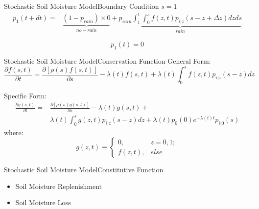 \documentclass[10pt]{beamer}
\begin{document}
\begin{frame}{Stochastic Soil Moisture Model}{Boundary Condition $s=1$} 
{
\begin{equation*}
\label{basic00}
\begin{split}
p_1(t+dt)=&\underbrace{(1-p_{rain})\times 0}_{no-rain}+\underbrace{p_{rain} \int_{1}^{1}\int_{0}^{s} f(z,t)p_{i|z}(s-z+\Delta z)dzds}_{rain}
\end{split}
\end{equation*}
}
{
\centering{\textcolor[rgb]{1,0,0}{\Huge{$\Downarrow$}}}
 
\begin{equation*}
p_1(t)=0
\end{equation*} 
}
\end{frame}




\begin{frame}{Stochastic Soil Moisture Model}{Conservation Function}
\textcolor[rgb]{1,0,0}{General Form}: 
\begin{equation*}
 \frac{\partial{f(s,t)}}{\partial t}=\frac{\partial{[\rho(s)f(s,t)]}}{\partial s}-\lambda(t)f(s,t)+\lambda(t)\int_{0}^{s} f(z,t)p_{i|z}(s-z)dz
 \end{equation*}

\textcolor[rgb]{1,0,0}{Specific Form}:
\begin{equation*}
\begin{split}
 \frac{\partial{g(s,t)}}{\partial t}=&\frac{\partial{[\rho(s)g(s,t)]}}{\partial s}-\lambda(t)g(s,t)+\\
 &\lambda(t)\int_{0}^{s} g(z,t)p_{i|z}(s-z)dz+\lambda(t)p_0(0)e^{-\lambda(t) t}p_{i|0}(s)
 \end{split}
\end{equation*}
where:
 \begin{equation*}
g(z,t)\equiv
 \begin{cases}
 0,&z=0,1;\\  f(z,t),&else
 \end{cases}
 \end{equation*}
 
 
\end{frame}

\renewcommand{\thefootnote}{\fnsymbol{footnote}}
\setcounter{footnote}{0}


\begin{frame}{Stochastic Soil Moisture Model}{Constitutive Function}
\begin{itemize}
\item Soil Moisture Replenishment  
\item Soil Moisture Loss  
\end{itemize} 
\end{frame}
\end{document}
